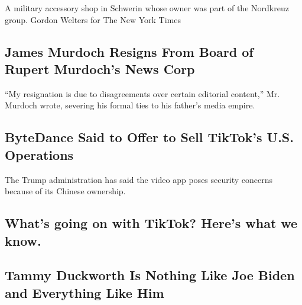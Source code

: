 \href{/2020/08/01/world/europe/germany-nazi-infiltration.html}{}

A military accessory shop in Schwerin whose owner was part of the
Nordkreuz group. Gordon Welters for The New York Times

\href{/2020/07/31/business/media/james-murdoch-resigns-news-corp.html}{}

\hypertarget{james-murdoch-resigns-from-board-of-rupert-murdochs-news-corp}{%
\subsection{James Murdoch Resigns From Board of Rupert Murdoch's News
Corp}\label{james-murdoch-resigns-from-board-of-rupert-murdochs-news-corp}}

``My resignation is due to disagreements over certain editorial
content,'' Mr. Murdoch wrote, severing his formal ties to his father's
media empire.

\href{/2020/08/01/technology/tiktok-sale-trump-ban.html}{}

\hypertarget{bytedance-said-to-offer-to-sell-tiktoks-us-operations}{%
\subsection{ByteDance Said to Offer to Sell TikTok's U.S.
Operations}\label{bytedance-said-to-offer-to-sell-tiktoks-us-operations}}

The Trump administration has said the video app poses security concerns
because of its Chinese ownership.

\href{/2020/08/01/technology/tiktok-trump-microsoft-bytedance-china-ban.html}{}

\hypertarget{whats-going-on-with-tiktok-heres-what-we-know}{%
\subsection{What's going on with TikTok? Here's what we
know.}\label{whats-going-on-with-tiktok-heres-what-we-know}}

\href{/2020/08/01/us/politics/tammy-duckworth-biden-vp.html}{}

\hypertarget{tammy-duckworth-is-nothing-like-joe-biden-and-everything-like-him}{%
\subsection{Tammy Duckworth Is Nothing Like Joe Biden and Everything
Like
Him}\label{tammy-duckworth-is-nothing-like-joe-biden-and-everything-like-him}}

